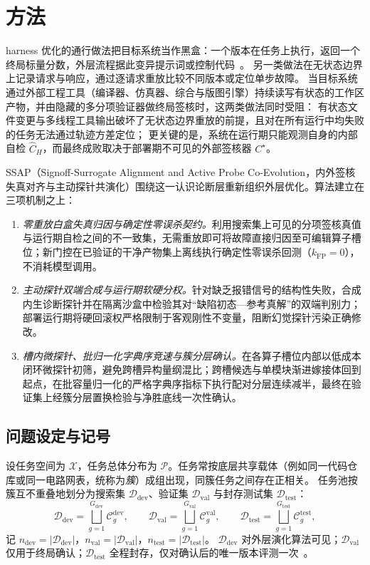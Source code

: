 \documentclass[UTF8,a4paper,10.5pt]{ctexart}
\newcommand{\method}{SSAP}
\newcommand{\Ddev}{\mathcal{D}_{\mathrm{dev}}}
\newcommand{\Dval}{\mathcal{D}_{\mathrm{val}}}
\newcommand{\Dtest}{\mathcal{D}_{\mathrm{test}}}
\begin{document}
\pagestyle{plain}

\section{方法}
\label{sec:method}

harness 优化的通行做法把目标系统当作黑盒：一个版本在任务上执行，返回一个终局标量分数，外层流程据此变异提示词或控制代码~\cite{vero,hob,metaharness}。
另一类做法在无状态边界上记录请求与响应，通过逐请求重放比较不同版本或定位单步故障。
当目标系统通过外部工程工具（编译器、仿真器、综合与版图引擎）持续读写有状态的工作区产物，并由隐藏的多分项验证器做终局签核时，这两类做法同时受阻：
有状态文件变更与多线程工具输出破坏了无状态边界重放的前提，且对在所有运行中均失败的任务无法通过轨迹方差定位；
更关键的是，系统在运行期只能观测自身的内部自检 $\hat{C}_H$，而最终成败取决于部署期不可见的外部签核器 $C^\star$。

\method{}（Signoff-Surrogate Alignment and Active Probe Co-Evolution，内外签核失真对齐与主动探针共演化）围绕这一认识论断层重新组织外层优化。算法建立在三项机制之上：
\begin{enumerate}
  \item \emph{零重放白盒失真归因与确定性零误杀契约。}利用搜索集上可见的分项签核真值与运行期自检之间的不一致集，无需重放即可将故障直接归因至可编辑算子槽位；新门控在已验证的干净产物集上离线执行确定性零误杀回测（$k_{\mathrm{FP}}=0$），不消耗模型调用。
  \item \emph{主动探针双端合成与运行期软硬分权。}针对缺乏报错信号的结构性失败，合成内生诊断探针并在隔离沙盒中检验其对“缺陷初态—参考真解”的双端判别力；部署运行期将硬回滚权严格限制于客观刚性不变量，阻断幻觉探针污染正确修改。
  \item \emph{槽内微探针、批归一化字典序竞速与簇分层确认。}在各算子槽位内部以低成本闭环微探针初筛，避免跨槽异构量纲混比；跨槽候选与单模块渐进嫁接体回到起点，在批容量归一化的严格字典序指标下执行配对分层连续减半，最终在验证集上经簇分层置换检验与净胜底线一次性确认。
\end{enumerate}

\subsection{问题设定与记号}
\label{sec:setup}

设任务空间为 $\mathcal{X}$，任务总体分布为 $\mathcal{P}$。任务常按底层共享载体（例如同一代码仓库或同一电路网表，统称为\emph{簇}）成组出现，同簇任务之间存在正相关。
任务池按簇互不重叠地划分为搜索集 $\Ddev$、验证集 $\Dval$ 与封存测试集 $\Dtest$：
\begin{equation}
  \Ddev = \bigsqcup_{g=1}^{G_{\mathrm{dev}}} \mathcal{C}^{\mathrm{dev}}_g,\qquad
  \Dval = \bigsqcup_{g=1}^{G_{\mathrm{val}}} \mathcal{C}^{\mathrm{val}}_g,\qquad
  \Dtest = \bigsqcup_{g=1}^{G_{\mathrm{test}}} \mathcal{C}^{\mathrm{test}}_g,
\end{equation}
记 $n_{\mathrm{dev}}=|\Ddev|$，$n_{\mathrm{val}}=|\Dval|$，$n_{\mathrm{test}}=|\Dtest|$。
$\Ddev$ 对外层演化算法可见；$\Dval$ 仅用于终局确认；$\Dtest$ 全程封存，仅对确认后的唯一版本评测一次~\cite{dwork2015}。
\end{document}

